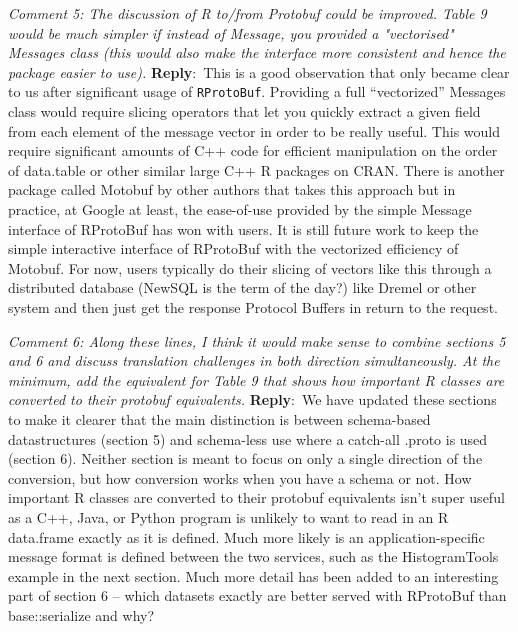 \documentclass[10pt]{article}
\newcommand{\pointRaised}[2]{\smallskip %
  \textsl{{\fontseries{b}\selectfont #1}: #2}\newline}
\newcommand{\reply}[1]{\textbf{Reply}:\ #1 \smallskip } %
\begin{document}
\pointRaised{Comment 5}{The discussion of R to/from Protobuf could be improved. Table 9 would be
  much simpler if instead of Message, you provided a "vectorised"
  Messages class (this would also make the interface more consistent and
  hence the package easier to use).}
\reply{This is a good observation that only became clear to us after
  significant usage of \texttt{RProtoBuf}.  Providing a full ``vectorized'' Messages class would require slicing
  operators that let you quickly extract a given field from each
  element of the message vector in order to be really useful.  This
  would require significant amounts of C++ code for efficient
  manipulation on the order of data.table or other similar large C++ R
  packages on CRAN.  There is another package called Motobuf by other authors
  that takes this approach but in practice, at Google at least, the
  ease-of-use provided by the simple Message interface of RProtoBuf
  has won with users.  It is still future work to keep the simple
  interactive interface of RProtoBuf with the vectorized efficiency of
  Motobuf.  For now, users typically do their slicing of vectors like
  this through a distributed database (NewSQL is the term of the day?)
  like Dremel or other system and then just get the response Protocol
  Buffers in return to the request.}

\pointRaised{Comment 6}{Along these lines, I think it would make sense to combine sections 5
  and 6 and discuss translation challenges in both direction
  simultaneously. At the minimum, add the equivalent for Table 9 that
  shows how important R classes are converted to their protobuf
  equivalents.}
\reply{We have updated these sections to make it clearer that the main
  distinction is between schema-based datastructures (section 5) and
  schema-less use where a catch-all .proto is used (section 6).
  Neither section is meant to focus on only a single direction of the
  conversion, but how conversion works when you have a schema or not.
  How important R classes are converted to their protobuf equivalents
  isn't super useful as a C++, Java, or Python program is unlikely to
  want to read in an R data.frame exactly as it is defined.  Much more
  likely is an application-specific message format is defined between the
  two services, such as the HistogramTools example in the next section.
  Much more detail has been added to an interesting part of section 6 --
  which datasets exactly are better served with RProtoBuf than
  base::serialize and why?}
\end{document}
